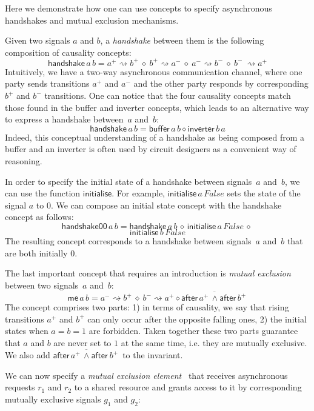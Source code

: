 \documentclass[british,compsoc]{IEEEtran}
\begin{document}
Here we demonstrate how one can use concepts to specify asynchronous handshakes
and mutual exclusion mechanisms.

Given two signals $a$ and $b$, a \emph{handshake} between them is
the following composition of causality concepts:
\[
\mathsf{handshake}\,a \,b=a^{+}\!\rightsquigarrow\! b^{+}\ \diamond\ b^{+}\!\rightsquigarrow\! a^{-}\ \diamond\ a^{-}\!\rightsquigarrow\! b^{-}\ \diamond\ b^{-}\ \rightsquigarrow\! a^{+}
\]
Intuitively, we have a two-way asynchronous communication channel,
where one party sends transitions $a^{+}$ and $a^{-}$ and the other
party responds by corresponding $b^{+}$ and $b^{-}$ transitions.
One can notice that the four causality concepts match those found
in the buffer and inverter concepts, which leads to an alternative
way to express a handshake between~$a$ and~$b$:
\[
\mathsf{handshake}\,a \,b=\mathsf{buffer}\,a \,b \diamond\mathsf{inverter}\,b \,a
\]
Indeed, this conceptual understanding of a handshake as being composed
from a buffer and an inverter is often used by circuit designers as
a convenient way of reasoning.

In order to specify the initial state of a handshake between signals~$a$
and~$b$, we can use the function $\mathsf{initialise}$.
For example, $\mathsf{initialise}\,a \,False$ sets the state of the signal
$a$ to $0$. We can compose an initial state concept with
the handshake concept as follows:
\[
\mathsf{handshake00}\,a \,b \!=\!\mathsf{handshake}\,a \,b \, \diamond\,\mathsf{initialise}\,a \,False \,\diamond \,
\]
\[
\mathsf{initialise}\,b \,False
\]
The resulting concept corresponds to a handshake between signals~$a$
and~$b$ that are both initially $0$.

The last important concept that requires an introduction is \emph{mutual
exclusion} between two signals~$a$ and~$b$:
\[
\mathsf{me}\,a \,b =a^{-}\rightsquigarrow b^{+}\ \diamond\ b^{-}\rightsquigarrow a^{+}\diamond\overline{\mathsf{after}\,a^{+} \, \wedge\mathsf{after}\,b^{+}\, }
\]
The concept comprises two parts: 1) in terms of causality, we say
that rising transitions $a^{+}$ and $b^{+}$ can only occur after
the opposite falling ones, 2) the initial states when $a=b=1$ are
forbidden. Taken together these two parts guarantee that $a$ and
$b$ are never set to $1$ at the same time, i.e. they are mutually
exclusive. We also add $\overline{\mathsf{after}\, a^{+} \, \wedge\mathsf{after}\ b^{+}\,}$
to the invariant.

We can now specify a \emph{mutual exclusion element}~\cite{2008_kinniment_synchronisation}
that receives asynchronous requests $r_{1}$ and $r_{2}$ to a shared
resource and grants access to it by corresponding mutually exclusive
signals $g_{1}$ and $g_{2}$:
\end{document}
